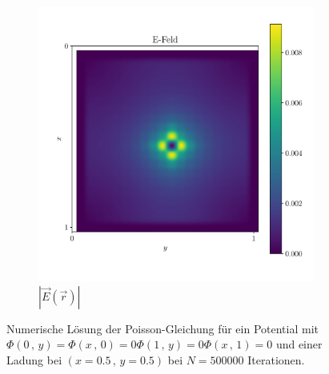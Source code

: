 \begin{figure}[H]
\begin{subfigure}[b]{0.45\textwidth}
        \includegraphics[width=\textwidth]{Abbildungen/E_c.pdf}
           \caption{$\left|\vec{E}\left(\vec{r}\right)\right|$}
   \end{subfigure}
   \caption{Numerische Lösung der Poisson-Gleichung für ein Potential mit $\Phi\left(0\,,\,y\right)=
\Phi\left(x\,,\,0\right)=0
\Phi\left(1\,,\,y\right)=0
\Phi\left(x\,,\,1\right)=0$ und einer Ladung bei $\left(x=0.5\,,\,y=0.5\right)$ bei
   $N=500000$ Iterationen. }\label{c}
   \end{figure}\noindent 